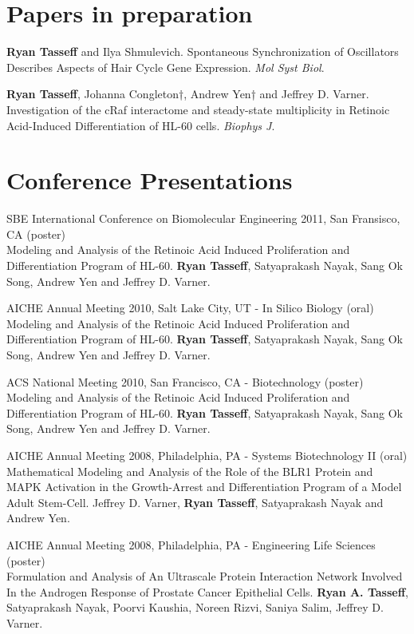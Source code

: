 \documentclass[margin,line]{res}
\begin{document}
\begin{resume}
\section{\sc Papers in preparation}
{\bf Ryan Tasseff} and Ilya Shmulevich.
Spontaneous Synchronization of Oscillators Describes Aspects of Hair Cycle Gene Expression.  
{\it Mol Syst Biol}. 
	
{\bf Ryan Tasseff}, Johanna Congleton†, Andrew Yen† and Jeffrey D. Varner.
Investigation of the cRaf interactome and steady-state multiplicity in 
Retinoic Acid-Induced Differentiation of HL-60 cells.
{\it Biophys J}.

\section{\sc Conference Presentations}
SBE International Conference on Biomolecular Engineering 2011, San Fransisco, CA (poster)\\
Modeling and Analysis of the Retinoic Acid Induced Proliferation and Differentiation Program of HL-60.
{\bf Ryan Tasseff}, Satyaprakash Nayak, Sang Ok Song, Andrew Yen and Jeffrey D. Varner.


AICHE Annual Meeting 2010, Salt Lake City, UT - In Silico Biology (oral) \\
Modeling and Analysis of the Retinoic Acid Induced Proliferation and Differentiation Program of HL-60.
{\bf Ryan Tasseff}, Satyaprakash Nayak, Sang Ok Song, Andrew Yen and Jeffrey D. Varner.

ACS National Meeting 2010, San Francisco, CA - Biotechnology (poster)\\
Modeling and Analysis of the Retinoic Acid Induced Proliferation and Differentiation Program of HL-60.
{\bf Ryan Tasseff}, Satyaprakash Nayak, Sang Ok Song, Andrew Yen and Jeffrey D. Varner.

AICHE Annual Meeting 2008, Philadelphia, PA - Systems Biotechnology II (oral)\\
Mathematical Modeling and Analysis of the Role of the BLR1 Protein and MAPK Activation 
in the Growth-Arrest and Differentiation Program of a Model Adult Stem-Cell.
Jeffrey D. Varner, {\bf Ryan Tasseff}, Satyaprakash Nayak and Andrew Yen.

AICHE Annual Meeting 2008, Philadelphia, PA - Engineering Life Sciences (poster)\\
Formulation and Analysis of An Ultrascale Protein Interaction Network Involved In the Androgen Response of 
Prostate Cancer Epithelial Cells.
{\bf Ryan A. Tasseff}, Satyaprakash Nayak, Poorvi Kaushia, Noreen Rizvi, Saniya Salim, Jeffrey D. Varner.


\end{resume}
\end{document}
